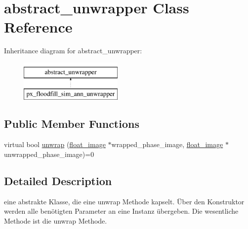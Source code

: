 \hypertarget{classabstract__unwrapper}{\section{abstract\-\_\-unwrapper Class Reference}
\label{classabstract__unwrapper}
}
Inheritance diagram for abstract\-\_\-unwrapper\-:\begin{figure}[H]
\begin{center}
\leavevmode
\includegraphics[height=2.000000cm]{classabstract__unwrapper}
\end{center}
\end{figure}
\subsection*{Public Member Functions}
\begin{DoxyCompactItemize}
\item 
virtual bool \hyperlink{classabstract__unwrapper_a6d5c72cae9fcea45668cb02ddd3d9012}{unwrap} (\hyperlink{classfloat__image}{float\-\_\-image} $\ast$wrapped\-\_\-phase\-\_\-image, \hyperlink{classfloat__image}{float\-\_\-image} $\ast$unwrapped\-\_\-phase\-\_\-image)=0
\end{DoxyCompactItemize}


\subsection{Detailed Description}
eine abstrakte Klasse, die eine unwrap Methode kapselt. Über den Konstruktor werden alle benötigten Parameter an eine Instanz übergeben. Die wesentliche Methode ist die unwrap Methode. 

